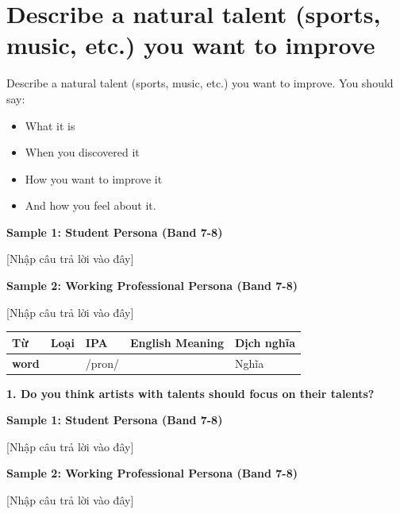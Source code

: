 \section{Describe a natural talent (sports, music, etc.) you want to improve}
\begin{ieltsprompt}
Describe a natural talent (sports, music, etc.) you want to improve.
You should say:
\begin{itemize}[leftmargin=2em, itemsep=2pt]
\item What it is
\item When you discovered it
\item How you want to improve it
\item And how you feel about it.
\end{itemize}
\end{ieltsprompt}
\begin{ieltsanswer}
\textbf{Sample 1: Student Persona (Band 7-8)}

[Nhập câu trả lời vào đây]

\textbf{Sample 2: Working Professional Persona (Band 7-8)}

[Nhập câu trả lời vào đây]
\end{ieltsanswer}


\vspace{0.8em}
\begin{center}
\renewcommand{\arraystretch}{1.65}
\begin{tabularx}{\textwidth}{|V{0.22\textwidth}|C{0.07\textwidth}|I{0.20\textwidth}|Y|V{0.18\textwidth}|}
\hline
{}
\textbf{Từ} & \textbf{Loại} & \textbf{IPA} & \textbf{English Meaning} & \textbf{Dịch nghĩa} \\
\hline
\textbf{word} & & /pron/ & & Nghĩa \\ \hline
\end{tabularx}
\end{center}

\partthreeheader

\begin{ieltsquestion}
\textbf{1. Do you think artists with talents should focus on their talents?}
\end{ieltsquestion}
\textbf{Sample 1: Student Persona (Band 7-8)}

[Nhập câu trả lời vào đây]

\textbf{Sample 2: Working Professional Persona (Band 7-8)}

[Nhập câu trả lời vào đây]

